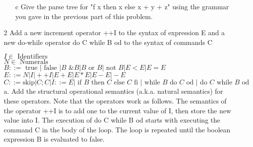 \begin{enumerate}
\begin{enumerate}
\item[c]{ Give the parse tree for "f x then x else x + y + z" using the grammar you gave in the previous part of this problem. }


\end{enumerate}

\item[2] Add a new increment operator ++I to the syntax of expression E and a new do-while operator do C while B od to the syntax of commands C

\( I \in \text{ Identifiers } \) \\
\( N \in \text{ Numerals } \) \\
\( B ::= \text{ true } | \text{ false } | B \text{ \& } B | B \text{ or } B | \text{ not } B | E < E | E = E \) \\
\( E ::= N | I | ++I | E + E | E * E | E - E | - E \) \\
\( C ::= \text{skip} | C;C | I ::= E | \text{ if } B \text{ then } C \text{ else } C \text{ fi } | \text{ while } B \text{ do } C \text{ od } | \text{ do } C \text{ while } B \text{ od } \) \\

a. Add the structural operational semantics (a.k.a. natural semantics) for these operators. Note that the operators work as follows. The semantics of the operator ++I is to add one to the current value of I, then store the new value into I. The execution of do C while B od starts with executing the command C in the body of the loop. The loop is repeated until the boolean expression B is evaluated to false. \\


\end{enumerate}
